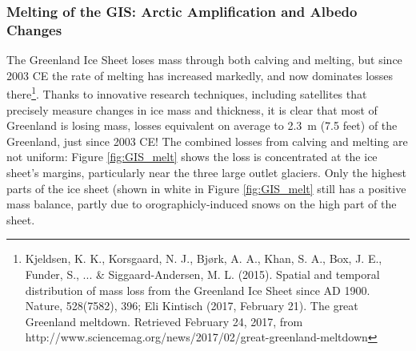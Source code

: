 \documentclass[amstex,12pt]{book}
\begin{document}
\subsubsection{Melting of the GIS: Arctic Amplification and Albedo Changes}
The Greenland Ice Sheet loses mass through both calving and melting, but since 2003 CE the rate of melting has increased markedly, and now dominates losses there\footnote{Kjeldsen, K. K., Korsgaard, N. J., Bjørk, A. A., Khan, S. A., Box, J. E., Funder, S., ... \& Siggaard-Andersen, M. L. (2015). Spatial and temporal distribution of mass loss from the Greenland Ice Sheet since AD 1900. Nature, 528(7582), 396; Eli Kintisch (2017, February 21). The great Greenland meltdown. Retrieved February 24, 2017, from http://www.sciencemag.org/news/2017/02/great-greenland-meltdown}. Thanks to innovative research techniques, including satellites that precisely measure changes in ice mass and thickness, it is clear that most of Greenland is losing mass, losses equivalent on average to \SI{2.3}{\metre} (7.5 feet) of the Greenland, just since 2003 CE! The combined losses from calving and melting are not uniform: Figure \ref{fig:GIS_melt} shows the loss is concentrated at the ice sheet's margins, particularly near the three large outlet glaciers. Only the highest parts of the ice sheet (shown in white in Figure \ref{fig:GIS_melt} still has a positive mass balance, partly due to orographicly-induced snows on the high part of the sheet.\\
\end{document}
